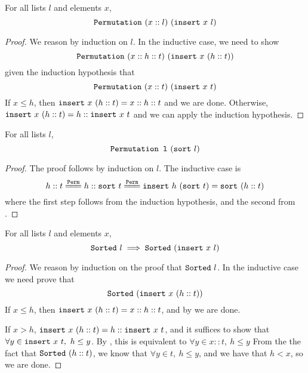 \documentclass[sigplan,10pt,anonymous,review]{thesis}
\begin{document}
\begin{lemma}
  For all lists $l$ and elements $x$,
  \begin{equation*}
    \texttt{\textup{Permutation}}~(x::l)~(\texttt{\textup{insert}}~x~l)
  \end{equation*}
\end{lemma}
\begin{proof}
  We reason by induction on $l$. In the inductive case, we need to show
  \begin{equation*}
    \texttt{\textup{Permutation}}~(x::h::t)~(\texttt{\textup{insert}}~x~(h::t))
  \end{equation*}
  given the induction hypothesis that
  \begin{equation*}
    \texttt{\textup{Permutation}}~(x::t)~(\texttt{\textup{insert}}~x~t)
  \end{equation*}
  If $x \le h$, then $\texttt{\textup{insert}}~x~(h::t) = x :: h :: t$ and we are
  done. Otherwise, $\texttt{\textup{insert}}~x~(h::t) = h :: \texttt{\textup{insert}}~x~t$ and
  we can apply the induction hypothesis.
\end{proof}

\begin{theorem}
  For all lists $l$,
  \begin{equation*}
    \texttt{\textup{Permutation~l}}~(\texttt{\textup{sort}}~l)
  \end{equation*}
\end{theorem}
\begin{proof}
  The proof follows by induction on $l$. The inductive case is
  \begin{equation*}
    h :: t \eqperm h :: \var{sort}~t \eqperm
    \var{insert}~h~(\var{sort}~t) = \var{sort}~(h :: t)
  \end{equation*}
  where the first step follows from the induction hypothesis, and the
  second from .
\end{proof}

\begin{lemma}
  For all lists $l$ and elements $x$,
  \begin{equation*}
    \texttt{\textup{Sorted}}~l \implies \texttt{\textup{Sorted}}~(\texttt{\textup{insert}}~x~l)
  \end{equation*}
\end{lemma}
\begin{proof}
  We reason by induction on the proof that $\texttt{\textup{Sorted}}~l$. In the
  inductive case we need prove that
  \begin{equation*}
    \texttt{\textup{Sorted}}~(\texttt{\textup{insert}}~x~(h::t))
  \end{equation*}
  If $x \le h$, then $\texttt{\textup{insert}}~x~(h::t) = x :: h :: t$, and by
   we are done.

  If $x > h$, $\texttt{\textup{insert}}~x~(h::t) = h :: \texttt{\textup{insert}}~x~t$, and it
  suffices to show that $\forall y \in \texttt{\textup{insert}}~x~t,~h \le y$. By
  , this is equivalent to $\forall y \in x::t,~h \le y$ From
  the the fact that $\texttt{\textup{Sorted}}~(h::t)$, we know that $\forall y \in t,~h \le
  y$, and we have that $h < x$, so we are done.
\end{proof}
\end{document}
